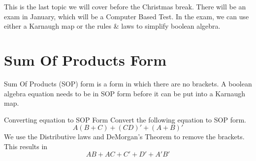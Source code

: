 
This is the last topic we will cover before the Christmas break. There will be an exam in January, which will be a Computer Based Test. In the exam, we can use either a Karnaugh map or the rules \& laws to simplify boolean algebra.

\section*{Sum Of Products Form}
Sum Of Products (SOP) form is a form in which there are no brackets. A boolean algebra equation needs to be in SOP form before it can be put into a Karnaugh map. 
\begin{example}{Converting equation to SOP Form}
Convert the following equation to SOP form.
\[A(B+C)+(CD)'+(A+B)'\]
We use the Distributive laws and DeMorgan's Theorem to remove the brackets. This results in
\[AB+AC+C'+D'+A'B'\]
\end{example}

